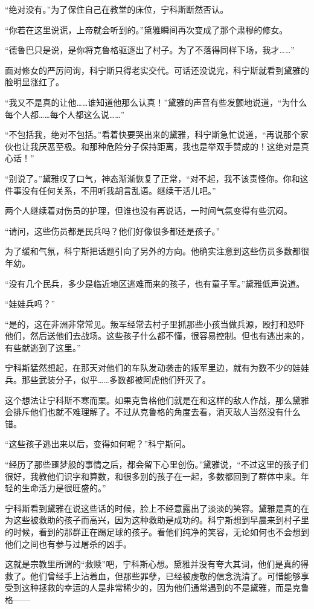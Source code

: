 “绝对没有。”为了保住自己在教堂的床位，宁科斯断然否认。

“你若在这里说谎，上帝就会听到的。”黛雅瞬间再次变成了那个肃穆的修女。

“德鲁巴只是说，是你将克鲁格驱逐出了村子。为了不落得同样下场，我才……”

面对修女的严厉问询，科宁斯只得老实交代。可话还没说完，科宁斯就看到黛雅的脸明显涨红了。

“我又不是真的让他……谁知道他那么认真！”黛雅的声音有些发颤地说道，“为什么每个人都……每个人都这么说……”

“不包括我，绝对不包括。”看着快要哭出来的黛雅，科宁斯急忙说道，“再说那个家伙也让我厌恶至极。和那种危险分子保持距离，我也是举双手赞成的！这绝对是真心话！”

“别说了。”黛雅叹了口气，神态渐渐恢复了正常，“对不起，我不该责怪你。你和这件事没有任何关系，不用听我胡言乱语。继续干活儿吧。”

两个人继续着对伤员的护理，但谁也没有再说话，一时间气氛变得有些沉闷。

“请问，这些伤员都是民兵吗？他们好像很多都还是孩子。”

为了缓和气氛，科宁斯把话题引向了另外的方向。他确实注意到这些伤员多数都很年幼。

“没有几个民兵，多少是临近地区逃难而来的孩子，也有童子军。”黛雅低声说道。

“娃娃兵吗？”

“是的，这在非洲非常常见。叛军经常去村子里抓那些小孩当做兵源，殴打和恐吓他们，然后送他们去战场。这些孩子什么都不懂，很容易控制。但也有逃出来的，有些就逃到了这里。”

宁科斯猛然想起，在那天对他们的车队发动袭击的叛军里边，就有为数不少的娃娃兵。那些武装分子，似乎……多数都被阿虎他们歼灭了。

这个想法让宁科斯不寒而栗。如果克鲁格他们就是在和这样的敌人作战，那么黛雅会排斥他们也就不难理解了。不过从克鲁格的角度去看，消灭敌人当然没有什么错。

“这些孩子逃出来以后，变得如何呢？”科宁斯问。

“经历了那些噩梦般的事情之后，都会留下心里创伤。”黛雅说，“不过这里的孩子们很好，我教他们识字和算数，和很多别的孩子在一起，多数都回到了群体中来。年轻的生命活力是很旺盛的。”

宁科斯看到黛雅在说这些话的时候，脸上不经意露出了淡淡的笑容。黛雅是真的在为这些被救助的孩子而高兴，因为这种救助是成功的。科宁斯想到早晨来到村子里的时候，看到的那群正在踢足球的孩子。看他们纯净的笑容，无论如何也不会想到他们之间也有参与过屠杀的凶手。

这就是宗教里所谓的“救赎”吧，宁科斯心想。黛雅并没有夸大其词，他们是真的得救了。他们曾经手上沾着血，但那些罪孽，已经被虔敬的信念洗清了。可惜能够享受到这种拯救的幸运的人是非常稀少的，因为他们通常遇到的不是黛雅，而是克鲁格——

